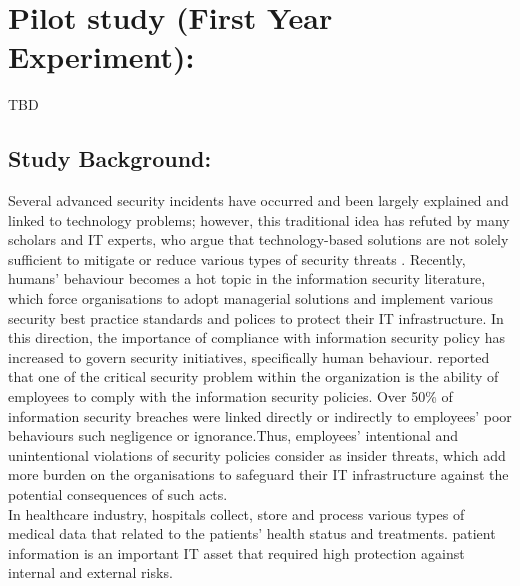 
\section{Pilot study (First Year Experiment):}
TBD
\subsection{Study Background:}
Several advanced security incidents have occurred and been largely explained and linked to technology problems; however, this traditional idea has refuted by many scholars and IT experts, who argue that technology-based solutions are not solely sufficient to mitigate or reduce various types of security threats \cite{Kim2014,Ashenden2008,Safa2015}. Recently, humans' behaviour becomes a hot topic in the information security literature, which force organisations to adopt managerial solutions and implement various security best practice standards and polices to protect their IT infrastructure. 
In this direction, the importance of compliance with information security policy has increased to govern security initiatives, specifically human behaviour. \cite{Siponen2010, Puhakainen2010} reported that one of the critical security problem within the organization is the ability of employees to comply with the information security policies. Over 50\% of information security breaches were linked directly or indirectly to employees' poor behaviours such negligence or ignorance\cite{Stanton2005,Siponen2010,Vroom2004a}.Thus, employees' intentional and unintentional violations of security policies consider as insider threats, which add more burden on the organisations to safeguard their IT infrastructure against the potential consequences of such acts.\\
In healthcare industry, hospitals collect, store and process various types of medical data that related to the patients' health status and treatments. patient information is an important IT asset that required high protection against internal and external risks.  

